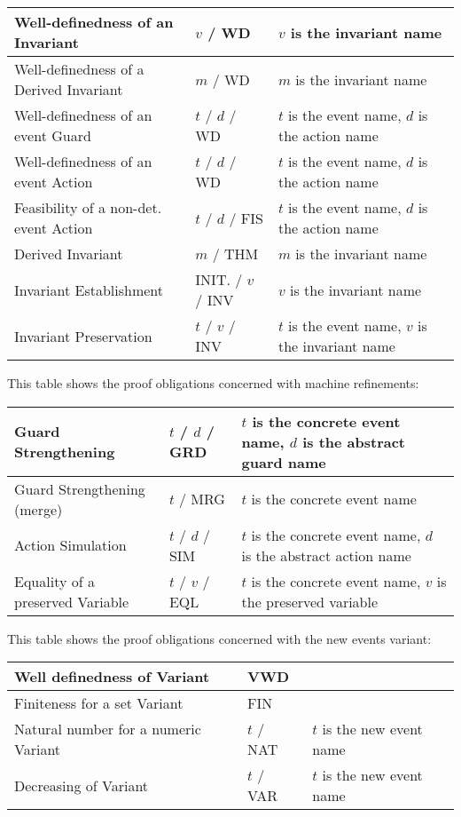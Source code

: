 \begin{center}
    \begin{tabular}{| p{6cm} | p{3cm} | p{5cm} |}
    \hline
	Well-definedness of an Invariant & $v$  / WD & $v$ is the invariant name\\ \hline
	Well-definedness of a Derived Invariant & $m$  / WD & $m$ is the invariant name \\ \hline
	Well-definedness of an event Guard & $t$  / $d$  / WD & $t$ is the event name, $d$ is the action name  \\ \hline
	Well-definedness of an event Action & $t$  / $d$  / WD & $t$ is the event name, $d$ is the action name  \\ \hline
	Feasibility of a non-det. event Action & $t$  / $d$  / FIS & $t$ is the event name, $d$ is the action name  \\ \hline
	Derived Invariant & $m$ / THM & $m$ is the invariant name \\ \hline
	Invariant Establishment & INIT.  / $v$  / INV & $v$ is the invariant name  \\ \hline
	Invariant Preservation & $t$  / $v$  / INV & $t$ is the event name, $v$ is the invariant name  \\ \hline
    \end{tabular}
\end{center}

This table shows the proof obligations concerned with machine refinements:

\begin{center}
    \begin{tabular}{| p{6cm} | p{3cm} | p{5cm} |}
    \hline
	Guard Strengthening & $t$  / $d$  / GRD & $t$ is the concrete event name, $d$ is the abstract guard name\\ \hline
	Guard Strengthening (merge) & $t$  / MRG & $t$ is the concrete event name \\ \hline
	Action Simulation & $t$  / $d$  / SIM & $t$ is the concrete event name, $d$ is the abstract action name  \\ \hline
	Equality of a preserved Variable & $t$  / $v$  / EQL & $t$ is the concrete event name, $v$ is the preserved variable  \\ \hline
    \end{tabular}
\end{center}

This table shows the proof obligations concerned with the new events variant:

\begin{center}
    \begin{tabular}{| p{6cm} | p{3cm} | p{5cm} |}
    \hline
	Well definedness of Variant & VWD & \\ \hline
	Finiteness for a set Variant & FIN &  \\ \hline
	Natural number for a numeric Variant & $t$  / NAT & $t$ is the new event name \\ \hline
	Decreasing of Variant & $t$  / VAR & $t$ is the new event name  \\ \hline
    \end{tabular}
\end{center}

